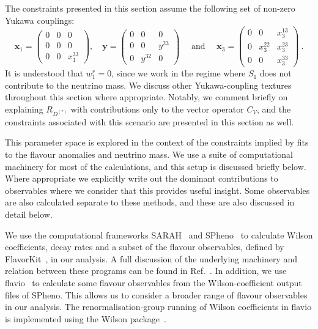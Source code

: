 The constraints presented in this section assume the following set of non-zero
Yukawa couplings:
\begin{equation}
\mathbf{x}_{1} = \begin{pmatrix} 0 & 0 & 0 \\
                                0 & 0 & 0 \\
                                0 & 0 & x^{33}_{1}
                              \end{pmatrix}, \quad
\mathbf{y} = \begin{pmatrix} 0 & 0 & 0 \\
                             0 & 0 & y^{23} \\
                             0 & y^{32} & 0
                             \end{pmatrix}
                             \quad \text{ and } \quad
\mathbf{x}_{3} = \begin{pmatrix} 0 & 0 & x_{3}^{13} \\
                                 0 & x^{22}_{3} & x^{23}_{3} \\
                                 0 & 0 & x_{3}^{33}
                                \end{pmatrix} \ .
\end{equation}
It is understood that $w_{1}^r = 0$, since we work in the regime where $S_{1}$
does not contribute to the neutrino mass. We discuss other Yukawa-coupling
textures throughout this section where appropriate. Notably, we comment briefly
on explaining $R_{D^{(*)}}$ with contributions only to the vector operator
$C_{V}$, and the constraints associated with this scenario are presented in this
section as well.

This parameter space is explored in the context of the constraints implied by
fits to the flavour anomalies and neutrino mass. We use a suite of computational
machinery for most of the calculations, and this setup is discussed briefly
below. Where appropriate we explicitly write out the dominant contributions to
observables where we consider that this provides useful insight. Some
observables are also calculated separate to these methods, and these are also
discussed in detail below.

We use the computational frameworks \textsf{SARAH}~\cite{Porod:2014xia,
  Porod:2011nf} and \textsf{SPheno}~\cite{Porod:2011nf} to calculate Wilson
coefficients, decay rates and a subset of the flavour observables, defined by
\textsf{FlavorKit}~\cite{Porod:2014xia}, in our analysis. A full discussion of
the underlying machinery and relation between these programs can be found in
Ref.~\cite{Vicente:2015zba}. In addition, we use
\textsf{flavio}~\cite{Straub:2018kue} to calculate some flavour observables from
the Wilson-coefficient output files of \textsf{SPheno}. This allows us to
consider a broader range of flavour observables in our analysis. The
renormalisation-group running of Wilson coefficients in \textsf{flavio} is
implemented using the \textsf{Wilson} package~\cite{Aebischer:2018bkb}.

